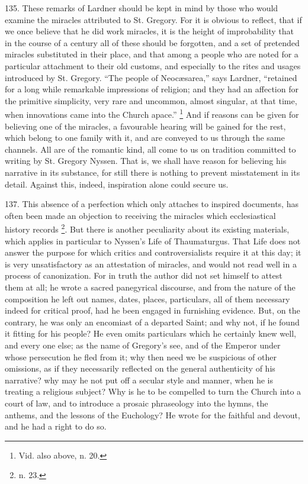 135.
These remarks of Lardner should be kept in mind by those who would
examine the miracles attributed to St. Gregory. For it is obvious to
reflect, that if we once believe that he did work miracles, it is the
height of improbability that in the course of a century all of these
should be forgotten, and a set of pretended miracles substituted in
their place, and that among a people who are noted for a particular
attachment to their old customs, and especially to the rites and
usages introduced by St. Gregory. ``The people of Neocæsarea,'' says
Lardner, ``retained for a long while remarkable impressions of
religion; and they had an affection for the primitive simplicity, very
rare and uncommon, almost singular, at that time, when innovations
came into the Church apace.'' \footnote{Vid. also above, n. 20.}
And if reasons can be given for believing one of the miracles, a
favourable hearing will be gained for the rest, which belong to one
family with it, and are conveyed to us through the same channels. All
are of the romantic kind, all come to us on tradition committed to
writing by St. Gregory Nyssen. That is, we shall have reason for
believing his narrative in its substance, for still there is nothing
to prevent misstatement in its detail. Against this, indeed,
inspiration alone could secure us.

137.
This absence of a perfection which only attaches to inspired
documents, has often been made an objection to receiving the miracles
which ecclesiastical history records \footnote{n. 23.}. But there is another peculiarity about its existing materials,
which applies in particular to Nyssen's Life of Thaumaturgus. That
Life does not answer the purpose for which critics and
controversialists require it at this day; it is very unsatisfactory as
an attestation of miracles, and would not read well in a process of
canonization. For in truth the author did not set himself to attest
them at all; he wrote a sacred panegyrical discourse, and from the
nature of the composition he left out names, dates, places,
particulars, all of them necessary indeed for critical proof, had he
been engaged in furnishing evidence. But, on the contrary, he was only
an encomiast of a departed Saint; and why not, if he found it fitting
for his people? He even omits particulars which he certainly knew
well, and every one else; as the name of Gregory's see, and of the
Emperor under whose persecution he fled from it; why then need
we be suspicious of other omissions, as if they necessarily reflected
on the general authenticity of his narrative? why may he not put off a
secular style and manner, when he is treating a religious subject? Why
is he to be compelled to turn the Church into a court of law, and to
introduce a prosaic phraseology into the hymns, the anthems, and the
lessons of the Euchology? He wrote for the faithful and devout, and he
had a right to do so.

